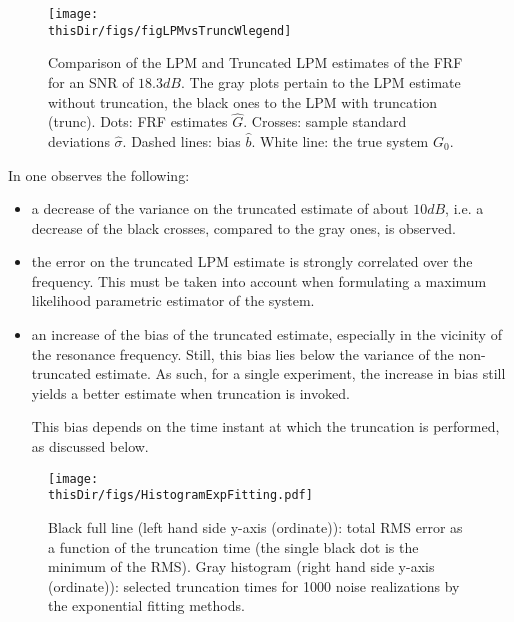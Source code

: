 \begin{figure}[tbh] %
\centering


\texttt{[image: \\thisDir/figs/figLPMvsTruncWlegend]}

\caption{Comparison of the \gls{LPM} and Truncated \gls{LPM} estimates of the \gls{FRF} for an \gls{SNR} of $18.3\unit{dB}$. The gray plots pertain to the \gls{LPM} estimate without truncation, the black ones to the \gls{LPM} with truncation (trunc). Dots: \gls{FRF} estimates $\hat{G}$. Crosses: sample standard deviations $\hat{\sigma}$. Dashed lines: bias $\hat{b}$. White line: the true system $G_0$.}
\label{figLPMvsTrunc}
\end{figure}





In  one observes the following:
\begin{itemize}
\item
a decrease of the variance on the truncated estimate of about $10 \unit{dB}$,  i.e. a decrease of the black crosses, compared to the gray ones, is observed. %

\item
the error on the truncated \gls{LPM} estimate is strongly correlated over the frequency. This must be taken into account when formulating a maximum likelihood parametric estimator of the system.

\item
an increase of the bias of the truncated estimate, especially in the vicinity of the resonance frequency. Still, this bias lies below the variance of the non-truncated estimate. As such, for a single experiment, the increase in bias still yields a better estimate when truncation is invoked.

This bias depends on the time instant at which the truncation is performed, as discussed below.

\end{itemize}

\begin{figure}[htb] %
   \centering



	\texttt{[image: \\thisDir/figs/HistogramExpFitting.pdf]}
 \caption{Black full line (left hand side y-axis (ordinate)): total \gls{RMS} error as a function of the truncation time (the single black dot is the minimum of the \gls{RMS}). Gray histogram (right hand side y-axis (ordinate)): selected truncation times for 1000 noise realizations by the exponential fitting methods.}



   \label{fig:pdfAndRMSeVStruncTime}
\end{figure}

